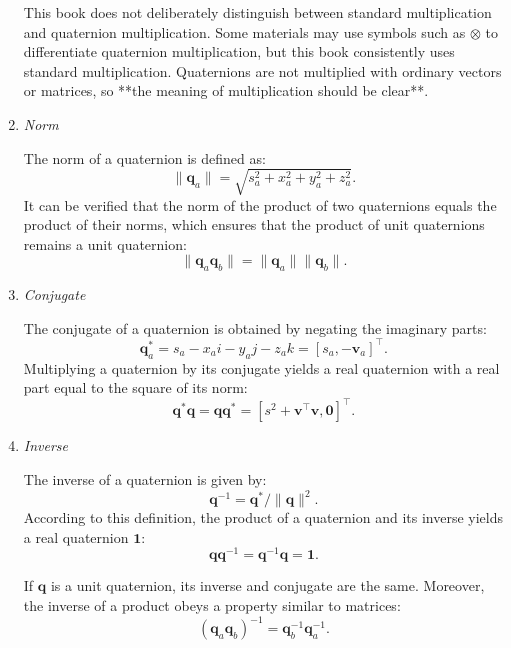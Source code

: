 \begin{enumerate}
	This book does not deliberately distinguish between standard multiplication and quaternion multiplication. Some materials may use symbols such as $\otimes$ to differentiate quaternion multiplication, but this book consistently uses standard multiplication. Quaternions are not multiplied with ordinary vectors or matrices, so **the meaning of multiplication should be clear**.
	
	\item \emph{Norm}
	
	The norm of a quaternion is defined as:
	\begin{equation}
		\| \mathbf{q}_a \| = \sqrt{ s_a^2 + x_a^2 + y_a^2 + z_a^2 }.
	\end{equation}
	It can be verified that the norm of the product of two quaternions equals the product of their norms, which ensures that the product of unit quaternions remains a unit quaternion:
	\begin{equation}
		\| \mathbf{q}_a \mathbf{q}_b \| = \|\mathbf{q}_a \| \| \mathbf{q}_b \|.
	\end{equation}
	
	\item \emph{Conjugate}
	
	The conjugate of a quaternion is obtained by negating the imaginary parts:
	\begin{equation}
		\mathbf{q}_a^* = s_a - x_ai - y_aj - z_ak = [s_a, -\mathbf{v}_a]^\top.
	\end{equation}
	Multiplying a quaternion by its conjugate yields a real quaternion with a real part equal to the square of its norm:
	\begin{equation}
		\mathbf{q}^* \mathbf{q} = \mathbf{q} \mathbf{q}^* = [s^2+\mathbf{v}^\top \mathbf{v}, \mathbf{0} ]^\top.
	\end{equation}
	
	\item \emph{Inverse}
	
	The inverse of a quaternion is given by:
	\begin{equation}
		\label{eq:quaternionInverse}
		\mathbf{q}^{-1} = \mathbf{q}^* / \| \mathbf{q} \| ^2.
	\end{equation}
	According to this definition, the product of a quaternion and its inverse yields a real quaternion $\mathbf{1}$:
	\begin{equation}
		\mathbf{q} \mathbf{q}^{-1} = \mathbf{q}^{-1} \mathbf{q} = \mathbf{1}.
	\end{equation}
	
	If $\mathbf{q}$ is a unit quaternion, its inverse and conjugate are the same. Moreover, the inverse of a product obeys a property similar to matrices:
	\begin{equation}
		\left( \mathbf{q}_a \mathbf{q}_b \right)^{-1} = \mathbf{q}_b^{-1} \mathbf{q}_a^{-1}.
	\end{equation}
	

\end{enumerate}

